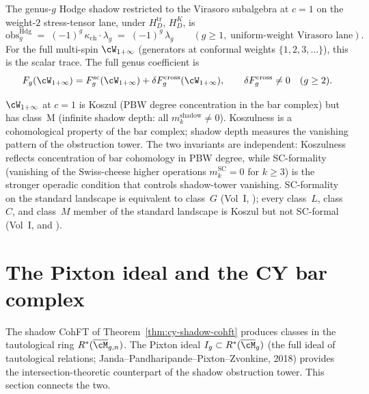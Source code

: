 The genus-$g$ Hodge shadow restricted to the Virasoro subalgebra at $c = 1$ on the weight-$2$ stress-tensor lane, under $H_D^{\mathrm{tr}}$, $H_D^K$, is
\[
 \mathrm{obs}_g^{\mathrm{Hdg}} \;=\; (-1)^g\,\kappa_{\mathrm{ch}} \cdot \lambda_g \;=\; (-1)^g\,\lambda_g
 \qquad (g \geq 1,\; \text{uniform-weight Virasoro lane}).
\]
For the full multi-spin $\cW_{1+\infty}$ (generators at conformal weights $\{1, 2, 3, \ldots\}$), this is the scalar trace.  The full genus coefficient is
\[
 F_g(\cW_{1+\infty}) =
 F_g^{\mathrm{sc}}(\cW_{1+\infty}) +
 \delta F_g^{\mathrm{cross}}(\cW_{1+\infty}),
 \qquad
 \delta F_g^{\mathrm{cross}} \neq 0 \quad (g \geq 2).
\]

\begin{remark}
\label{rem:c3-depth-vs-koszul}
$\cW_{1+\infty}$ at $c = 1$ is Koszul (PBW degree concentration in the bar complex) but has class~M (infinite shadow depth: all $m_k^{\mathrm{shadow}} \neq 0$). Koszulness is a cohomological property of the bar complex; shadow depth measures the vanishing pattern of the obstruction tower. The two invariants are independent: Koszulness reflects concentration of bar cohomology in PBW degree, while SC-formality (vanishing of the Swiss-cheese higher operations $m_k^{\mathrm{SC}} = 0$ for $k \geq 3$) is the stronger operadic condition that controls shadow-tower vanishing. SC-formality on the standard landscape is equivalent to class~$G$ (Vol~I, \cite{VolI}); every class~$L$, class~$C$, and class~$M$ member of the standard landscape is Koszul but not SC-formal (Vol~I, \cite{VolI} and \cite{VolI}).
\end{remark}



\section{The Pixton ideal and the CY bar complex}
\label{sec:pixton-cy-bar}

The shadow CohFT of Theorem~\ref{thm:cy-shadow-cohft} produces classes in the tautological ring $R^*(\overline{\cM}_{g,n})$. The Pixton ideal $I_g \subset R^*(\overline{\cM}_g)$ (the full ideal of tautological relations; Janda--Pandharipande--Pixton--Zvonkine, 2018) provides the intersection-theoretic counterpart of the shadow obstruction tower. This section connects the two.

